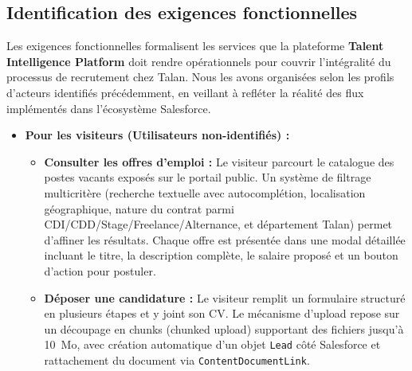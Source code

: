 \subsection{Identification des exigences fonctionnelles}

Les exigences fonctionnelles formalisent les services que la plateforme \textbf{Talent Intelligence Platform} doit rendre opérationnels pour couvrir l'intégralité du processus de recrutement chez Talan. Nous les avons organisées selon les profils d'acteurs identifiés précédemment, en veillant à refléter la réalité des flux implémentés dans l'écosystème Salesforce.

\begin{itemize}

\item \textbf{Pour les visiteurs (Utilisateurs non-identifiés) :}
\begin{itemize}
    \item \textbf{Consulter les offres d'emploi :} Le visiteur parcourt le catalogue des postes vacants exposés sur le portail public. Un système de filtrage multicritère (recherche textuelle avec autocomplétion, localisation géographique, nature du contrat parmi CDI/CDD/Stage/Freelance/Alternance, et département Talan) permet d'affiner les résultats. Chaque offre est présentée dans une modal détaillée incluant le titre, la description complète, le salaire proposé et un bouton d'action pour postuler.
    \item \textbf{Déposer une candidature :} Le visiteur remplit un formulaire structuré en plusieurs étapes et y joint son CV. Le mécanisme d'upload repose sur un découpage en chunks (chunked upload) supportant des fichiers jusqu'à 10~Mo, avec création automatique d'un objet \texttt{Lead} côté Salesforce et rattachement du document via \texttt{ContentDocumentLink}.
\end{itemize}


\end{itemize}
